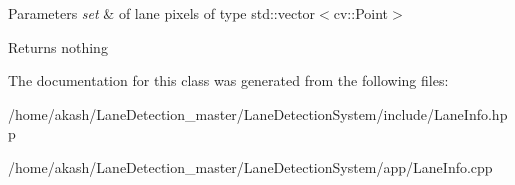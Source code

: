 \begin{DoxyParams}{Parameters}
{\em set} & of lane pixels of type std\+::vector$<$cv\+::\+Point$>$ \\
\hline
\end{DoxyParams}
\begin{DoxyReturn}{Returns}
nothing 
\end{DoxyReturn}


The documentation for this class was generated from the following files\+:\begin{DoxyCompactItemize}
\item 
/home/akash/\+Lane\+Detection\+\_\+master/\+Lane\+Detection\+System/include/Lane\+Info.\+hpp\item 
/home/akash/\+Lane\+Detection\+\_\+master/\+Lane\+Detection\+System/app/Lane\+Info.\+cpp\end{DoxyCompactItemize}
